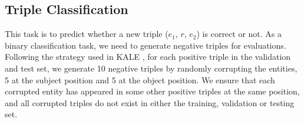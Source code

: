 




\subsection{Triple Classification}
This task is to predict whether a new triple ($e_1$, $r$, $e_2$) is correct or not.
As a binary classification task, we need to generate negative triples for evaluations.
Following the strategy used in KALE \cite{guo2016jointly},
for each positive triple in the validation and test set,
we generate 10 negative triples by randomly corrupting the entities, 5 at the subject
position and 5 at the object position. We ensure that each corrupted entity
has appeared in some other positive triples at the same position,
and all corrupted triples do not exist in either the training, validation or testing set.

